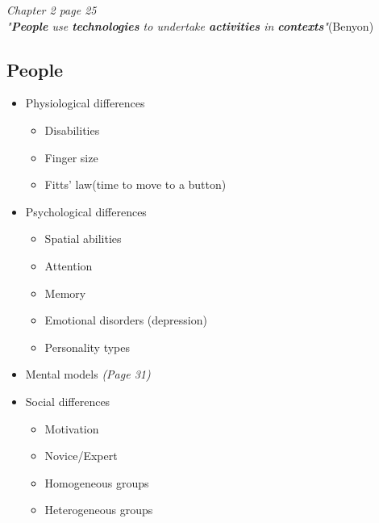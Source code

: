 \textit{Chapter 2 page 25}\\
\textit{"\textbf{People} use \textbf{technologies} to undertake \textbf{activities} in \textbf{contexts}"}(Benyon)

\subsection{People}
\begin{itemize}
	\item Physiological differences
	\begin{itemize}
		\item Disabilities
		\item Finger size
		\item Fitts' law(time to move to a button)
	\end{itemize}
	\item Psychological differences
	\begin{itemize}
		\item Spatial abilities
		\item Attention
		\item Memory
		\item Emotional disorders (depression)
		\item Personality types
	\end{itemize}
	\item Mental models \textit{(Page 31)}
	\item Social differences
	\begin{itemize}
		\item Motivation
		\item Novice/Expert
		\item Homogeneous groups
		\item Heterogeneous groups
	\end{itemize}
\end{itemize}

